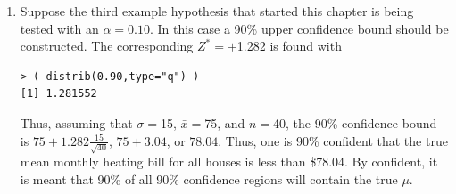 \documentclass[10pt,openany]{book}\usepackage[]{graphicx}\usepackage[]{color}
\makeatletter
\newenvironment{kframe}{%
 \def\at@end@of@kframe{}%
 \ifinner\ifhmode%
  \def\at@end@of@kframe{\end{minipage}}%
  \begin{minipage}{\columnwidth}%
 \fi\fi%
 \def\FrameCommand##1{\hskip\@totalleftmargin \hskip-\fboxsep
 \colorbox{shadecolor}{##1}\hskip-\fboxsep
     \hskip-\linewidth \hskip-\@totalleftmargin \hskip\columnwidth}%
 \MakeFramed {\advance\hsize-\width
   \@totalleftmargin\z@ \linewidth\hsize
   \@setminipage}}%
 {\par\unskip\endMakeFramed%
 \at@end@of@kframe}
\newenvironment{knitrout}{}{} %
\makeatother
\begin{document}
\begin{enumerate}
  \item Suppose the third example hypothesis that started this chapter is being tested with an $\alpha=0.10$.  In this case a 90\% upper confidence bound should be constructed.  The corresponding $Z^{*}=+$1.282 is found with
\begin{knitrout}
\color{fgcolor}\begin{kframe}
\begin{verbatim}
> ( distrib(0.90,type="q") )
[1] 1.281552
\end{verbatim}
\end{kframe}
\end{knitrout}
Thus, assuming that $\sigma=$15, $\bar{x}=$75, and $n=$40, the 90\% confidence bound is $75+1.282\frac{15}{\sqrt{40}}$, $75+3.04$, or $78.04$.  Thus, one is 90\% confident that the true mean monthly heating bill for all houses is less than \$78.04.  By confident, it is meant that 90\% of all 90\% confidence regions will contain the true $\mu$.
\end{enumerate}
\end{document}
